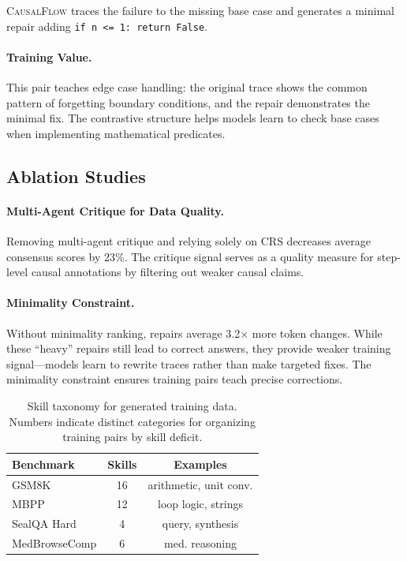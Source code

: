 \documentclass{article}
\theoremstyle{plain}
\theoremstyle{definition}
\theoremstyle{remark}
\begin{document}
\textsc{CausalFlow} traces the failure to the missing base case and generates a minimal repair adding \texttt{if n <= 1: return False}.

\paragraph{Training Value.} This pair teaches edge case handling: the original trace shows the common pattern of forgetting boundary conditions, and the repair demonstrates the minimal fix. The contrastive structure helps models learn to check base cases when implementing mathematical predicates.

\subsection{Ablation Studies}

\paragraph{Multi-Agent Critique for Data Quality.}
Removing multi-agent critique and relying solely on CRS decreases average consensus scores by 23\%. The critique signal serves as a quality measure for step-level causal annotations by filtering out weaker causal claims.

\paragraph{Minimality Constraint.}
Without minimality ranking, repairs average 3.2$\times$ more token changes. While these ``heavy'' repairs still lead to correct answers, they provide weaker training signal---models learn to rewrite traces rather than make targeted fixes. The minimality constraint ensures training pairs teach precise corrections.

\begin{table}[t]
  \caption{Skill taxonomy for generated training data. Numbers indicate distinct categories for organizing training pairs by skill deficit.}
  \label{tab:skills}
  \centering
  \begin{small}
    \begin{sc}
      \begin{tabular}{lcc}
        \toprule
        Benchmark & Skills & Examples \\
        \midrule
        GSM8K & 16 & arithmetic, unit conv. \\
        MBPP & 12 & loop logic, strings \\
        SealQA Hard & 4 & query, synthesis \\
        MedBrowseComp & 6 & med. reasoning \\
        \bottomrule
      \end{tabular}
    \end{sc}
  \end{small}
\end{table}
\end{document}
